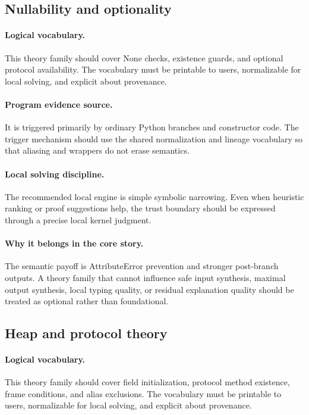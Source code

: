 \documentclass[11pt]{report}
\theoremstyle{definition}
\theoremstyle{plain}
\begin{document}
\subsection{Nullability and optionality}

\paragraph{Logical vocabulary.}
This theory family should cover None checks, existence guards, and optional protocol availability. The vocabulary must be printable to
users, normalizable for local solving, and explicit about provenance.

\paragraph{Program evidence source.}
It is triggered primarily by ordinary Python branches and constructor code. The trigger mechanism should use the
shared normalization and lineage vocabulary so that aliasing and wrappers do
not erase semantics.

\paragraph{Local solving discipline.}
The recommended local engine is simple symbolic narrowing. Even when heuristic ranking or
proof suggestions help, the trust boundary should be expressed through a
precise local kernel judgment.

\paragraph{Why it belongs in the core story.}
The semantic payoff is AttributeError prevention and stronger post-branch outputs. A theory family that cannot influence safe
input synthesis, maximal output synthesis, local typing quality, or residual
explanation quality should be treated as optional rather than foundational.

\subsection{Heap and protocol theory}

\paragraph{Logical vocabulary.}
This theory family should cover field initialization, protocol method existence, frame conditions, and alias exclusions. The vocabulary must be printable to
users, normalizable for local solving, and explicit about provenance.
\end{document}
